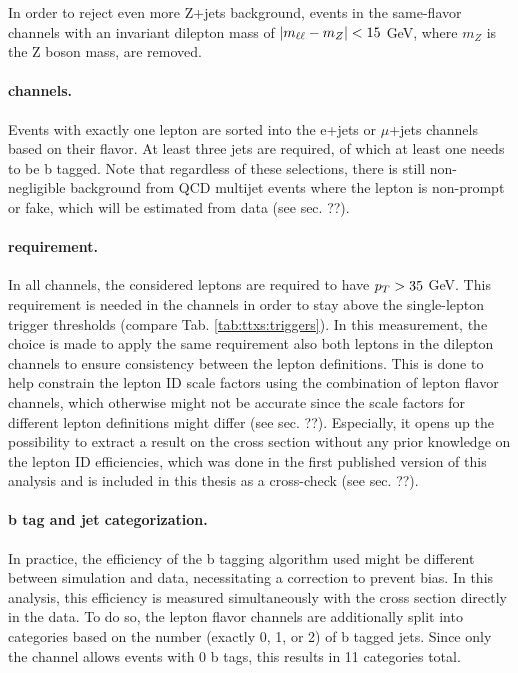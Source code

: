 In order to reject even more Z+jets background, events in the same-flavor channels with an invariant dilepton mass of $| m_{\ell\ell} - m_Z | < 15$ GeV, where $m_Z$ is the Z boson mass, are removed.

\paragraph{\ljets channels.}

Events with exactly one lepton are sorted into the e+jets or $\mu$+jets channels based on their flavor. At least three jets are required, of which at least one needs to be b tagged. Note that regardless of these selections, there is still non-negligible background from QCD multijet events where the lepton is non-prompt or fake, which will be estimated from data (see sec. ??).

\paragraph{\pt requirement.}

In all channels, the considered leptons are required to have $p_T > 35$ GeV. This requirement is needed in the \ljets channels in order to stay above the single-lepton trigger \pt thresholds (compare Tab. \ref{tab:ttxs:triggers}). In this measurement, the choice is made to apply the same \pt requirement also both leptons in the dilepton channels to ensure consistency between the lepton definitions. This is done to help constrain the lepton ID scale factors using the combination of lepton flavor channels, which otherwise might not be accurate since the scale factors for different lepton definitions might differ (see sec. ??). Especially, it opens up the possibility to extract a result on the cross section without any prior knowledge on the lepton ID efficiencies, which was done in the first published version of this analysis \cite{CMS:TOP-22-012-PAS} and is included in this thesis as a cross-check (see sec. ??).

\paragraph{b tag and jet categorization.}

In practice, the efficiency of the b tagging algorithm used might be different between simulation and data, necessitating a correction to prevent bias. In this analysis, this efficiency is measured simultaneously with the cross section directly in the data. To do so, the lepton flavor channels are additionally split into categories based on the number (exactly 0, 1, or 2) of b tagged jets. Since only the \emu channel allows events with 0 b tags, this results in 11 categories total.

